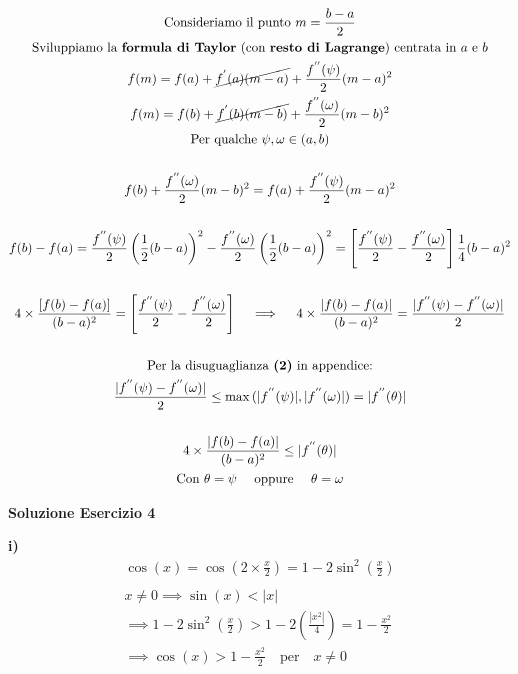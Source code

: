 \documentclass[11pt,reqno]{amsart}
\begin{document}
\begin{gather*}
  \text{Consideriamo il punto } m = \frac{b-a}{2}\\
  \text{Sviluppiamo la } \textbf{formula di Taylor} \text{ (con } \textbf{resto di Lagrange} \text{) centrata in } a \text{ e } b\\
  f(m) = f(a) + \cancel{f^{'}(a)(m-a)} + \frac{f^{''}(\psi)}{2}(m-a)^2\\
  f(m) = f(b) + \cancel{f^{'}(b)(m-b)} + \frac{f^{''}(\omega)}{2}(m-b)^2\\
  \text{Per qualche } \psi, \omega \in (a,b)\\\\
  f(b) + \frac{f^{''}(\omega)}{2}(m-b)^2 = f(a) + \frac{f^{''}(\psi)}{2}(m-a)^2\\\\
  f(b) - f(a) = \frac{f^{''}(\psi)}{2}\left(\frac{1}{2}(b-a)\right)^2 - \frac{f^{''}(\omega)}{2}\left(\frac{1}{2}(b-a)\right)^2 = \left[\frac{f^{''}(\psi)}{2} - \frac{f^{''}(\omega)}{2}\right]\frac{1}{4}(b-a)^2\\\\
  4\times\frac{[f(b) - f(a)]}{(b-a)^2} = \left[\frac{f^{''}(\psi)}{2} - \frac{f^{''}(\omega)}{2}\right] \quad \implies \quad 4\times\frac{|f(b) - f(a)|}{(b-a)^2} = \frac{|f^{''}(\psi) - f^{''}(\omega)|}{2}\\\\
  \text{Per la disuguaglianza } \textbf{(2)} \text{ in appendice:}\\
  \frac{|f^{''}(\psi) - f^{''}(\omega)|}{2} \leq \max{(|f^{''}(\psi)|,|f^{''}(\omega)|)} = |f^{''}(\theta)|\\\\
  4\times\frac{|f(b) - f(a)|}{(b-a)^2} \leq |f^{''}(\theta)|\\
  \text{Con } \theta = \psi \quad \text{ oppure } \quad \theta = \omega\\
\end{gather*}

\newpage
\centerline{\bf Soluzione Esercizio 4 }
\bigskip

{\bf i)}
\begin{gather*}
  \cos(x) = \cos\left(2 \times \frac{x}{2}\right) = 1-2\sin^2\left(\frac{x}{2}\right)\\\\
  x \neq 0 \implies \sin(x) < |x|\\
  \implies 1-2\sin^2\left(\frac{x}{2}\right) > 1-2\left(\frac{|x^2|}{4}\right) = 1-\frac{x^2}{2}\\
  \implies \cos(x) > 1-\frac{x^2}{2} \quad \text{per} \quad x\neq0\\
\end{gather*}
\end{document}
